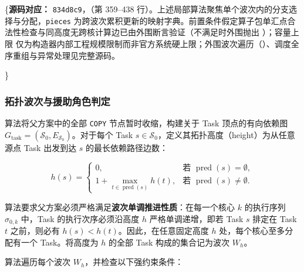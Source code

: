 \documentclass[anonymous,notoc]{gmcm2026}
\begin{document}
\{\small \textbf{源码对应：} \texttt{834d8c9}，\texttt{}（第 359--438 行）。上述局部算法聚焦单个波次内的分支选择与分配，\texttt{pieces} 为跨波次累积更新的映射字典。前置条件假定算子包单汇点合法性检查与同高度无跨核计算边已由外围断言验证（不满足时外围抛出 \texttt{}）；容量上限 \texttt{} 仅为构造器内部工程规模限制而非官方系统硬上限；外围波次遍历（\texttt{}）、调度全序重组与异常处理见完整源码。

\par

\}

\subsubsection{拓扑波次与援助角色判定}

算法将父方案中的全部 \texttt{COPY} 节点暂时收缩，构建关于 Task 顶点的有向依赖图 \(G_{\mathrm{task}} = (\mathcal{S}_0, E_{\mathcal{S}_0})\)。对于每个 Task \(s \in \mathcal{S}_0\)，定义其拓扑高度（height）为从任意源点 Task 出发到达 \(s\) 的最长依赖路径边数：

\begin{equation}
h(s) = \begin{cases} 0, & \text{若 } \operatorname{pred}(s) = \emptyset, \\ 1 + \max_{t \in \operatorname{pred}(s)} h(t), & \text{若 } \operatorname{pred}(s) \ne \emptyset. \end{cases}
\end{equation}

算法要求父方案必须严格满足\textbf{波次单调推进性质}：在每一个核心 \(k\) 的执行序列 \(\sigma_{0,k}\) 中，Task 的执行次序必须沿高度 \(h\) 严格单调递增，即若 Task \(s\) 排定在 Task \(t\) 之前，则必有 \(h(s) < h(t)\)。因此，在任意固定高度 \(h\) 处，每个核心至多分配有一个 Task。将高度为 \(h\) 的全部 Task 构成的集合记为波次 \(W_h\)。

算法遍历每个波次 \(W_h\)，并检查以下强约束条件：
\end{document}
